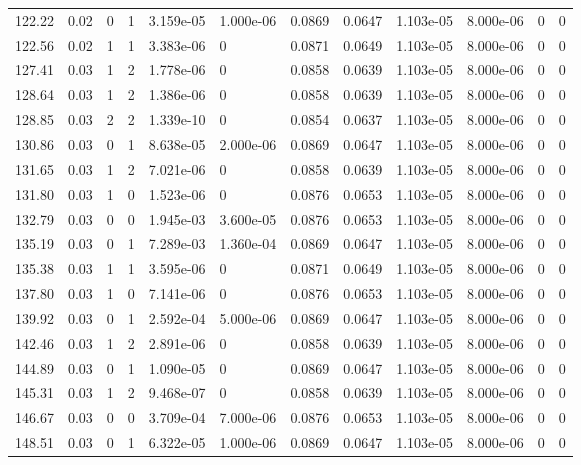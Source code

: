 \documentclass[preview]{standalone}
\begin{document}
{{{\begin{tabular}{L{1.2cm}C{1.2cm} C{0.3cm}C{0.5cm} C{1.4cm}C{1.4cm} C{1.4cm}C{1.4cm} C{1.6cm}C{1.6cm} C{1.6cm}C{1.6cm}}
  122.22  &  0.02  & 0     &  1 &  3.159e-05  & 1.000e-06  &  0.0869&   0.0647& 1.103e-05 & 8.000e-06   &  0 & 0  \\ 
  122.56  &  0.02  & 1     &  1 &  3.383e-06  & 0  &  0.0871&   0.0649& 1.103e-05 & 8.000e-06   &  0 & 0  \\ 
  127.41  &  0.03  & 1     &  2 &  1.778e-06  & 0  &  0.0858&   0.0639& 1.103e-05 & 8.000e-06   &  0 & 0  \\ 
  128.64  &  0.03  & 1     &  2 &  1.386e-06  & 0  &  0.0858&   0.0639& 1.103e-05 & 8.000e-06   &  0 & 0  \\ 
  128.85  &  0.03  & 2     &  2 &  1.339e-10  & 0  &  0.0854&   0.0637& 1.103e-05 & 8.000e-06   &  0 & 0  \\ 
  130.86  &  0.03  & 0     &  1 &  8.638e-05  & 2.000e-06  &  0.0869&   0.0647& 1.103e-05 & 8.000e-06   &  0 & 0  \\ 
  131.65  &  0.03  & 1     &  2 &  7.021e-06  & 0  &  0.0858&   0.0639& 1.103e-05 & 8.000e-06   &  0 & 0  \\ 
  131.80  &  0.03  & 1     &  0 &  1.523e-06  & 0  &  0.0876&   0.0653& 1.103e-05 & 8.000e-06   &  0 & 0  \\ 
  132.79  &  0.03  & 0     &  0 &  1.945e-03  & 3.600e-05  &  0.0876&   0.0653& 1.103e-05 & 8.000e-06   &  0 & 0  \\ 
  135.19  &  0.03  & 0     &  1 &  7.289e-03  & 1.360e-04  &  0.0869&   0.0647& 1.103e-05 & 8.000e-06   &  0 & 0  \\ 
  135.38  &  0.03  & 1     &  1 &  3.595e-06  & 0  &  0.0871&   0.0649& 1.103e-05 & 8.000e-06   &  0 & 0  \\ 
  137.80  &  0.03  & 1     &  0 &  7.141e-06  & 0  &  0.0876&   0.0653& 1.103e-05 & 8.000e-06   &  0 & 0  \\ 
  139.92  &  0.03  & 0     &  1 &  2.592e-04  & 5.000e-06  &  0.0869&   0.0647& 1.103e-05 & 8.000e-06   &  0 & 0  \\ 
  142.46  &  0.03  & 1     &  2 &  2.891e-06  & 0  &  0.0858&   0.0639& 1.103e-05 & 8.000e-06   &  0 & 0  \\ 
  144.89  &  0.03  & 0     &  1 &  1.090e-05  & 0  &  0.0869&   0.0647& 1.103e-05 & 8.000e-06   &  0 & 0  \\ 
  145.31  &  0.03  & 1     &  2 &  9.468e-07  & 0  &  0.0858&   0.0639& 1.103e-05 & 8.000e-06   &  0 & 0  \\ 
  146.67  &  0.03  & 0     &  0 &  3.709e-04  & 7.000e-06  &  0.0876&   0.0653& 1.103e-05 & 8.000e-06   &  0 & 0  \\ 
  148.51  &  0.03  & 0     &  1 &  6.322e-05  & 1.000e-06  &  0.0869&   0.0647& 1.103e-05 & 8.000e-06   &  0 & 0  \\ 

\end{tabular}}}}
\end{document}
